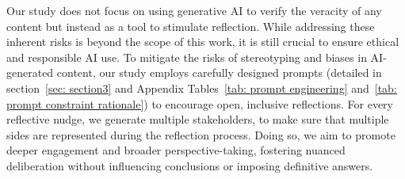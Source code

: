 Our study does not focus on using generative AI to verify the veracity of any content but instead as a tool to stimulate reflection. While addressing these inherent risks is beyond the scope of this work, it is still crucial to ensure ethical and responsible AI use. To mitigate the risks of stereotyping and biases in AI-generated content, our study employs carefully designed prompts (detailed in section~\ref{sec: section3} and Appendix Tables~\ref{tab: prompt engineering} and~\ref{tab: prompt constraint rationale}) to encourage open, inclusive reflections. For every reflective nudge, we generate multiple stakeholders, to make sure that multiple sides are represented during the reflection process. Doing so, we aim to promote deeper engagement and broader perspective-taking, fostering nuanced deliberation without influencing conclusions or imposing definitive answers. 